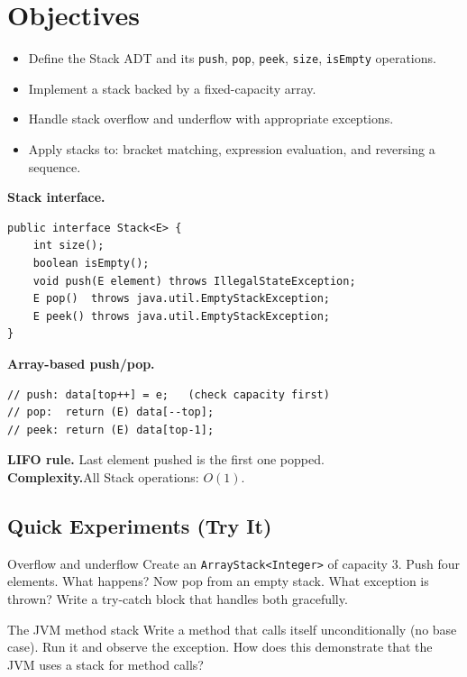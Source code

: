 \documentclass[11pt]{article}
\begin{document}
\labheader

\section*{Objectives}
\begin{itemize}[leftmargin=*,nosep]
  \item Define the Stack ADT and its \texttt{push}, \texttt{pop}, \texttt{peek}, \texttt{size}, \texttt{isEmpty} operations.
  \item Implement a stack backed by a fixed-capacity array.
  \item Handle stack overflow and underflow with appropriate exceptions.
  \item Apply stacks to: bracket matching, expression evaluation, and reversing a sequence.
\end{itemize}

\begin{summary}
\textbf{Stack interface.}
\begin{lstlisting}
public interface Stack<E> {
    int size();
    boolean isEmpty();
    void push(E element) throws IllegalStateException;
    E pop()  throws java.util.EmptyStackException;
    E peek() throws java.util.EmptyStackException;
}
\end{lstlisting}

\textbf{Array-based push/pop.}
\begin{lstlisting}
// push: data[top++] = e;   (check capacity first)
// pop:  return (E) data[--top];
// peek: return (E) data[top-1];
\end{lstlisting}

\textbf{LIFO rule.} Last element pushed is the first one popped.\\
\textbf{Complexity.}\quad All Stack operations: $O(1)$.
\end{summary}

\subsection*{Quick Experiments (Try It)}

\begin{tryit}{Overflow and underflow}
Create an \texttt{ArrayStack<Integer>} of capacity 3. Push four elements.
What happens? Now pop from an empty stack. What exception is thrown?
Write a try-catch block that handles both gracefully.
\end{tryit}

\begin{tryit}{The JVM method stack}
Write a method that calls itself unconditionally (no base case).
Run it and observe the exception.
How does this demonstrate that the JVM uses a stack for method calls?
\end{tryit}
\end{document}
